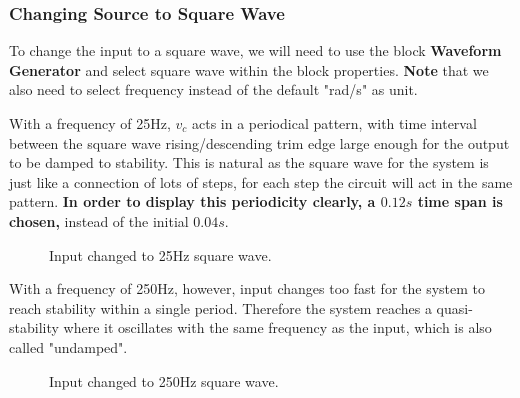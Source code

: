 \documentclass{article}
\begin{document}
  \subsubsection{Changing Source to Square Wave}
  To change the input to a square wave, we will need to use the block \textbf{Waveform Generator} and select square wave within the block properties. \textbf{Note} that we also need to select frequency instead of the default "rad/s" as unit.\par
  With a frequency of 25Hz, $v_c$ acts in a periodical pattern, with time interval between the square wave rising/descending trim edge large enough for the output to be damped to stability. This is natural as the square wave for the system is just like a connection of lots of steps, for each step the circuit will act in the same pattern. \textbf{In order to display this periodicity clearly, a $0.12 s$ time span is chosen,} instead of the initial $0.04 s$.
  \begin{figure}[H]
    \centering
    \noindent{}
    \caption{Input changed to 25Hz square wave.} \label{fig:25hz}
  \end{figure}
  With a frequency of 250Hz, however, input changes too fast for the system to reach stability within a single period. Therefore the system reaches a quasi-stability where it oscillates with the same frequency as the input, which is also called "undamped".
  \begin{figure}[H]
    \centering
    \noindent{}
    \caption{Input changed to 250Hz square wave.} \label{fig:250hz}
  \end{figure}
  
\end{document}
